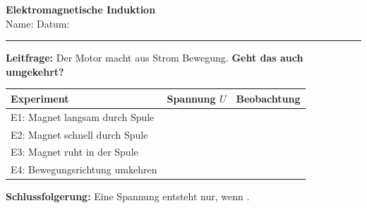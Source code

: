 \documentclass[11pt,a4paper]{article}
\newcommand{\luecke}[1]{\underline{\hspace{#1}}}
\begin{document}
\begin{minipage}[t]{0.80\textwidth}
    \vspace{0pt}
    {\Large\bfseries Elektromagnetische Induktion}\\[0.2em]
    {\small Name: \luecke{4.5cm} \hfill Datum: \luecke{2.5cm}}
\end{minipage}
\hfill
\begin{minipage}[t]{0.15\textwidth}
    \vspace{0pt}
    \raggedleft
    \href{https://devbox42.github.io/sciencesim/physik/kl09/motor-induktion/LP-09b-induktion.html}{}
\end{minipage}
\vspace{0.1em}
\hrule
\vspace{0.4em}

\begin{merkkasten}
\textbf{Leitfrage:} Der Motor macht aus Strom Bewegung. \textbf{Geht das auch umgekehrt?}
\end{merkkasten}

\vspace{0.3em}

\begin{protokollbox}[title=Kasten 1: Simulationsexperiment -- Protokoll]
\small
\renewcommand{\arraystretch}{1.25}
\begin{tabular}{|>{\raggedright\arraybackslash}p{4.2cm}|p{2.2cm}|p{7.5cm}|}
\hline
\textbf{Experiment} & \textbf{Spannung $U$} & \textbf{Beobachtung} \\
\hline
E1: Magnet langsam durch Spule & & \\[0.35cm]
\hline
E2: Magnet schnell durch Spule & & \\[0.35cm]
\hline
E3: Magnet ruht in der Spule & & \\[0.35cm]
\hline
E4: Bewegungsrichtung umkehren & & \\[0.35cm]
\hline
\end{tabular}

\vspace{0.3em}
\textbf{Schlussfolgerung:} Eine Spannung entsteht nur, wenn \luecke{5.5cm}.
\end{protokollbox}
\end{document}
